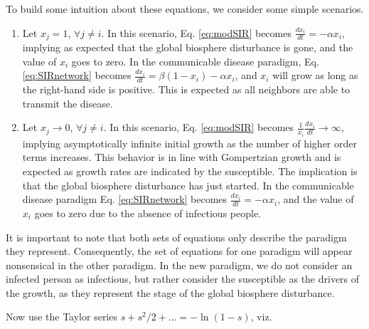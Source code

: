 \documentclass{article}
\begin{document}
To build some intuition about these equations, we consider some simple scenarios. 
\begin{enumerate}
\item Let $x_j=1$, $\forall j \neq i$. In this scenario, Eq. \ref{eq:modSIR} becomes $\frac{d x_i}{dt} = - \alpha x_i$, implying as expected that the global biosphere disturbance is gone, and the value of $x_i$ goes to zero. In the communicable disease paradigm, Eq. \ref{eq:SIRnetwork} becomes $\frac{d x_i}{dt} = \beta (1-x_i) - \alpha x_i$, and $x_i$ will grow as long as the right-hand side is positive. This is expected as all neighbors are able to transmit the disease.
\item Let $x_j \rightarrow 0$, $\forall j \neq i$. In this scenario, Eq. \ref{eq:modSIR} becomes $\frac{1}{x_i}\frac{d x_i}{dt} \rightarrow \infty$, implying asymptotically infinite initial growth as the number of higher order terms increases. This behavior is in line with Gompertzian growth and is expected as growth rates are indicated by the susceptible. The implication is that the global biosphere disturbance has just started. In the communicable disease paradigm Eq. \ref{eq:SIRnetwork} becomes $\frac{d x_i}{dt} = - \alpha x_i$, and the value of $x_i$ goes to zero due to the absence of infectious people.
\end{enumerate}
It is important to note that both sets of equations only describe the paradigm they represent. Consequently, the set of equations for one paradigm will appear nonsensical in the other paradigm. In the new paradigm, we do not consider an infected person as infectious, but rather consider the susceptible as the drivers of the growth, as they represent the stage of the global biosphere disturbance. 

Now use the Taylor series $s+s^2/2+... = -\ln(1-s)$, viz.
\end{document}
